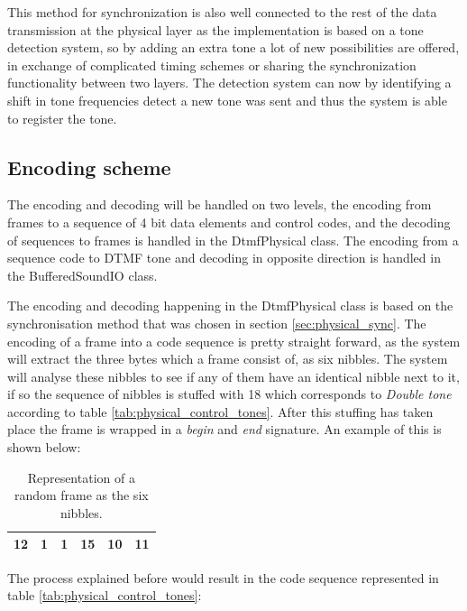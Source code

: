 	This method for synchronization is also well connected to the rest of the
	data transmission at the physical layer as the implementation is based on a tone detection system, so by adding an extra tone a lot of new
	possibilities are offered, in exchange of complicated timing schemes or sharing the synchronization functionality between two layers.
	The detection system can now by identifying a shift in tone frequencies detect a new tone was sent and thus the system is able to
	register the tone.
	
	\subsection{Encoding scheme}\label{sub:encoding_scheme}
	The encoding and decoding will be handled on two levels, the encoding from frames to a sequence of 4 bit data elements and control codes, and the decoding of sequences to frames is handled in the DtmfPhysical class. The encoding from a sequence code to DTMF tone and decoding in opposite direction is handled in the BufferedSoundIO class.
		
	The encoding and decoding happening in the DtmfPhysical class is based on the synchronisation method that was chosen in section \ref{sec:physical_sync}. The encoding of a frame into a code sequence is pretty straight forward, as the system will extract the three bytes which a frame consist of, as six nibbles. The system will analyse these nibbles to see if any of them have an identical nibble next to it, if so the sequence of nibbles is stuffed with 18 which corresponds to \textit{Double tone} according to table \ref{tab:physical_control_tones}. After this stuffing has taken place the frame is wrapped in a \textit{begin} and \textit{end} signature. An example of this is shown below:
	
	\begin{table}[!h]
		\begin{center}
			\begin{tabular}{|c|c|c|c|c|c|}
			\hline
			12 & 1 & 1 & 15 & 10 & 11 \\
			\hline
			\end{tabular}
		\end{center}
		\caption{Representation of a random frame as the six nibbles.}
		\label{tab:physical_frame}
	\end{table}
	
	The process explained before would result in the code sequence represented in table \ref{tab:physical_control_tones}:
	
